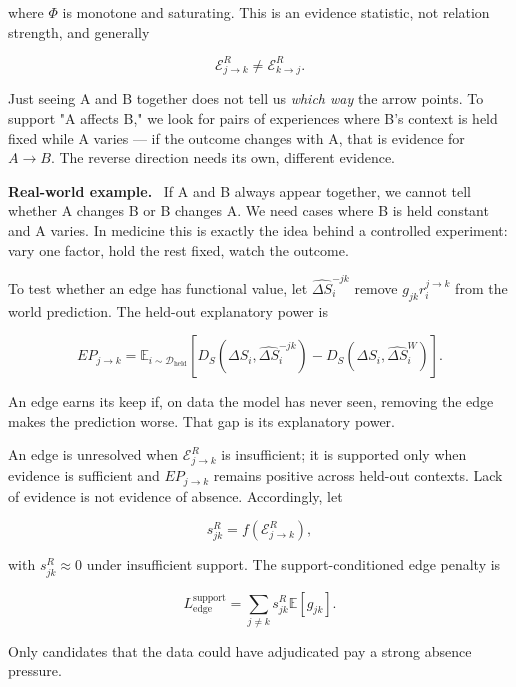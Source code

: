 \documentclass[11pt]{article}
\newenvironment{plainword}{%
  \par\medskip\noindent\begin{minipage}{\textwidth}%
  \color{gray!75!black}\small\itshape
}{%
  \end{minipage}\par\medskip}
\newenvironment{example}{%
  \par\smallskip\noindent\begin{minipage}{\textwidth}%
  \color{teal!60!black}\small
  \textbf{\color{teal!70!black}Real-world example.}\
}{%
  \end{minipage}\par\smallskip}
\begin{document}
where $\Phi$ is monotone and saturating. This is an evidence statistic, not relation strength, and generally

\[
\mathcal E_{j\rightarrow k}^{R}\neq\mathcal E_{k\rightarrow j}^{R}.
\]

\begin{plainword}
Just seeing A and B together does not tell us \emph{which way} the arrow points. To support "A affects B," we look for pairs of
experiences where B's context is held fixed while A varies --- if the outcome changes with A, that is evidence for $A\to B$. The
reverse direction needs its own, different evidence.
\end{plainword}

\begin{example}
If A and B always appear together, we cannot tell whether A changes B or B changes A. We need cases where B is held constant and
A varies. In medicine this is exactly the idea behind a controlled experiment: vary one factor, hold the rest fixed, watch the
outcome.
\end{example}

To test whether an edge has functional value, let $\widehat{\Delta S}_i^{-jk}$ remove $g_{jk}r_i^{j\rightarrow k}$ from the world
prediction. The held-out explanatory power is

\[
\boxed{
EP_{j\rightarrow k}=
\mathbb E_{i\sim\mathcal D_{\mathrm{held}}}
\left[
D_S(\Delta S_i,\widehat{\Delta S}_i^{-jk})
-D_S(\Delta S_i,\widehat{\Delta S}_i^W)
\right].}
\]

\begin{plainword}
An edge earns its keep if, on data the model has never seen, removing the edge makes the prediction worse. That gap is its
explanatory power.
\end{plainword}

An edge is unresolved when $\mathcal E_{j\rightarrow k}^{R}$ is insufficient; it is supported only when evidence is sufficient and
$EP_{j\rightarrow k}$ remains positive across held-out contexts. Lack of evidence is not evidence of absence. Accordingly, let

\[
s_{jk}^R=f(\mathcal E_{j\rightarrow k}^R),
\]

with $s_{jk}^R\approx0$ under insufficient support. The support-conditioned edge penalty is

\[
\boxed{L_{\mathrm{edge}}^{\mathrm{support}}=
\sum_{j\neq k}s_{jk}^R\mathbb E[g_{jk}].}
\]

Only candidates that the data could have adjudicated pay a strong absence pressure.
\end{document}

